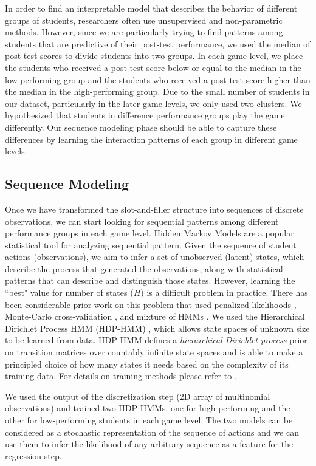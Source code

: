 \documentclass{sigchi}
\begin{document}
	In order to find an interpretable model that describes the behavior of different groups of students, researchers often use unsupervised and non-parametric methods.
	However, since we are particularly trying to find patterns among students that are predictive of their post-test performance, we used the median of post-test scores to divide students into two groups. 
	In each game level, we place the students who received a post-test score below or equal to the median in the low-performing group and the students who received a post-test score higher than the median in the high-performing group.
	Due to the small number of students in our dataset, particularly in the later game levels, we only used two clusters. 
	We hypothesized that students in difference performance groups play the game differently. 
	Our sequence modeling phase should be able to capture these differences by learning the interaction patterns of each group in different game levels.
	
	\subsection{Sequence Modeling}
	Once we have transformed the slot-and-filler structure into sequences of discrete observations, we can start looking for sequential patterns among different performance groups in each game level.
	Hidden Markov Models are a popular statistical tool for analyzing sequential pattern. 
	Given the sequence of student actions (observations), we aim to infer a set of unobserved (latent) states, which describe the process that generated the observations, along with statistical patterns that can describe and distinguish those states.
	However, learning the ``best" value for number of states ($H$) is a difficult problem in practice. 
	There has been considerable prior work on this problem that used penalized likelihoods \cite{rabiner1989hmm}, Monte-Carlo cross-validation \cite{smyth1996clustering}, and mixture of HMMs \cite{smyth1997clustering}.
	We used the Hierarchical Dirichlet Process HMM (HDP-HMM) \cite{fox2008hdp}, which allows state spaces of unknown size to be learned from data. 
	HDP-HMM defines a \textit{hierarchical Dirichlet process} prior on transition matrices over countably infinite state spaces and is able to make a principled choice of how many states it needs based on the complexity of its training data. 
	For details on training methods please refer to \cite{fox2008hdp}.
	
	We used the output of the discretization step (2D array of multinomial observations) and trained two HDP-HMMs, one for high-performing and the other for low-performing students in each game level. The two models can be considered as a stochastic representation of the sequence of actions and we can use them to infer the likelihood of any arbitrary sequence as a feature for the regression step. 
	
\end{document}
